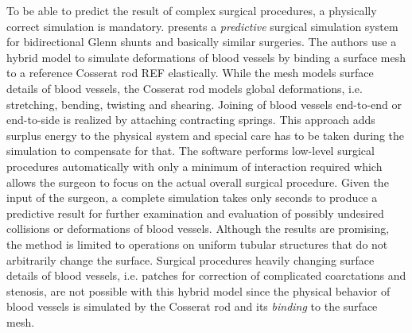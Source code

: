 To be able to predict the result of complex surgical procedures, a physically correct simulation is mandatory. \cite{Li2009} presents a {\itshape predictive} surgical simulation system for bidirectional Glenn shunts and basically similar surgeries. The authors use a hybrid model to simulate deformations of blood vessels by binding a surface mesh to a reference Cosserat rod REF elastically. While the mesh models surface details of blood vessels, the Cosserat rod models global deformations, i.e. stretching, bending, twisting and shearing.
Joining of blood vessels end-to-end or end-to-side is realized by attaching contracting springs. This approach adds surplus energy to the physical system and special care has to be taken during the simulation to compensate for that.\stefan{)}
 The software performs low-level surgical procedures automatically with only a minimum of interaction required which allows the surgeon to focus on the actual overall surgical procedure. Given the input of the surgeon, a complete simulation takes only seconds to produce a predictive result for further examination and evaluation of possibly undesired collisions or deformations of blood vessels.
Although the results are promising, the method is limited to operations on uniform tubular structures that do not arbitrarily change the surface. Surgical procedures heavily changing surface details of blood vessels, i.e. patches for correction of complicated coarctations and stenosis, are not possible with this hybrid model since the physical behavior of blood vessels is simulated by the Cosserat rod and its {\itshape binding} to the surface mesh.
 

